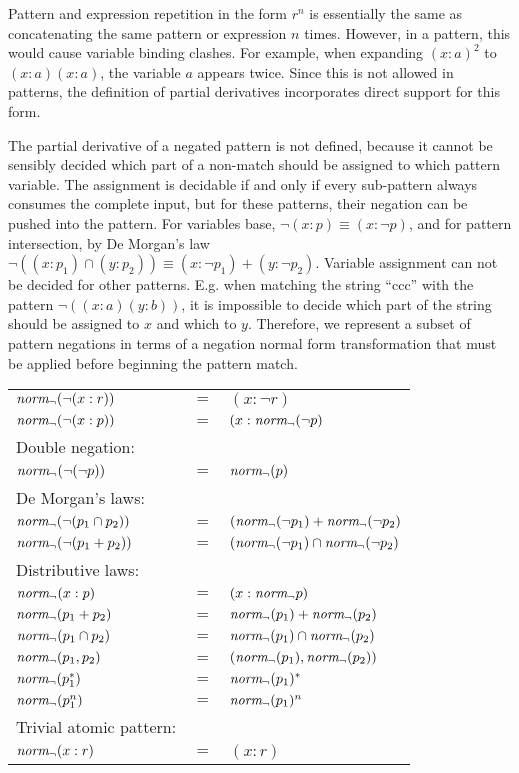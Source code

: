Pattern and expression repetition in the form $r^n$ is essentially the same as
concatenating the same pattern or expression $n$ times. However, in a pattern,
this would cause variable binding clashes. For example, when expanding
$(x:a)^2$ to $(x:a)(x:a)$, the variable $a$ appears twice. Since this is not
allowed in patterns, the definition of partial derivatives incorporates direct
support for this form.

The partial derivative of a negated pattern is not defined, because it cannot
be sensibly decided which part of a non-match should be assigned to which
pattern variable. The assignment is decidable if and only if every sub-pattern
always consumes the complete input, but for these patterns, their negation can
be pushed into the pattern. For variables base, $\neg(x:p) \equiv (x:\neg p)$,
and for pattern intersection, by De Morgan's law $\neg((x:p_1) \cap (y:p_2))
\equiv (x:\neg p_1) + (y:\neg p_2)$. Variable assignment can not be decided
for other patterns. E.g. when matching the string ``ccc'' with the pattern
$\neg((x:a)(y:b))$, it is impossible to decide which part of the string should
be assigned to $x$ and which to $y$. Therefore, we represent a subset of
pattern negations in terms of a negation normal form transformation that must
be applied before beginning the pattern match.

\begin{tabular}{lll}
   $\mathit{norm_\neg}(\neg(x : r))$		& $=$	& $(x : \neg r)$					\\
   $\mathit{norm_\neg}(\neg(x : p))$		& $=$	& $(x : \mathit{norm_\neg}(\neg p)$				\\
   Double negation:			&	&							\\
   $\mathit{norm_\neg}(\neg(\neg p))$		& $=$	& $\mathit{norm_\neg}(p)$						\\
   De Morgan's laws:			&	&							\\
   $\mathit{norm_\neg}(\neg(p_1 \cap p_2))$	& $=$	& $(\mathit{norm_\neg}(\neg p_1) + \mathit{norm_\neg}(\neg p_2)$		\\
   $\mathit{norm_\neg}(\neg(p_1 + p_2))$		& $=$	& $(\mathit{norm_\neg}(\neg p_1) \cap \mathit{norm_\neg}(\neg p_2)$		\\
   Distributive laws:			&	&							\\
   $\mathit{norm_\neg}(x : p)$			& $=$	& $(x : \mathit{norm_\neg} p)$					\\
   $\mathit{norm_\neg}(p_1 + p_2)$		& $=$	& $\mathit{norm_\neg}(p_1) + \mathit{norm_\neg}(p_2)$			\\
   $\mathit{norm_\neg}(p_1 \cap p_2)$		& $=$	& $\mathit{norm_\neg}(p_1) \cap \mathit{norm_\neg}(p_2)$			\\
   $\mathit{norm_\neg}(p_1, p_2)$			& $=$	& $(\mathit{norm_\neg}(p_1), \mathit{norm_\neg}(p_2))$			\\
   $\mathit{norm_\neg}(p_1^*)$			& $=$	& $\mathit{norm_\neg}(p_1)^*$					\\
   $\mathit{norm_\neg}(p_1^n)$			& $=$	& $\mathit{norm_\neg}(p_1)^n$					\\
   Trivial atomic pattern:		&	&							\\
   $\mathit{norm_\neg}(x : r)$			& $=$	& $(x : r)$						\\
\end{tabular}

